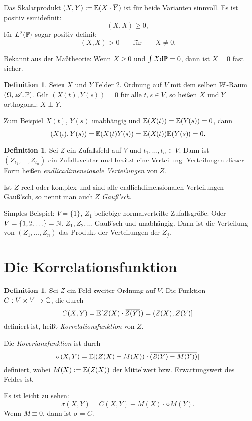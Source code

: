 \documentclass[
 a4paper,
 12pt,
 parskip=half
 ]{scrreprt}
\theoremstyle{plain}
\theoremstyle{definition}
\newtheorem{defn}[thm]{Definition}
\numberwithin{equation}{section}
\begin{document}
Das Skalarprodukt $(X,Y) := \pE( X \cdot \obar{Y})$ ist für beide Varianten
sinnvoll. Es ist positiv semidefinit:
\[ (X,X) \ge 0, \]
für $L^2(\mathbb{P})$ sogar
positiv definit:
\[ (X,X) > 0 \qquad \text{für} \qquad X \ne 0. \]

Bekannt aus der Maßtheorie: Wenn $X \ge 0$ und $\int X \mathrm{d} \mathbb{P} = 0$, dann
ist $X = 0$ fast sicher.

\begin{defn}
  Seien $X$ und $Y$ Felder 2. Ordnung auf $V$ mit dem selben $\mathbb{W}$-Raum
  $(\Omega, \mathscr{A}, \mathbb{P})$. Gilt $(X(t),Y(s)) = 0$ für alle $t,s \in V$, so heißen
  $X$ und $Y$ orthogonal: $X \perp Y$.

  Zum Beispiel $X(t)$, $Y(s)$ unabhängig und $\mathbb{E}(X(t)) = \mathbb{E}(Y(s)) = 0$, dann
  \[ (X(t),Y(s)) = \pE(X(t) \obar{Y(s)}) = \pE(X(t)) \pE(\obar{Y(s)}) = 0. \]
\end{defn}

\begin{defn}
  Sei $Z$ ein Zufallsfeld auf $V$ und $t_1, \ldots, t_n \in V$. Dann ist $(Z_{t_1},
  \ldots, Z_{t_n})$ ein Zufallsvektor und besitzt eine Verteilung. Verteilungen
  dieser Form heißen \emph{endlichdimensionale Verteilungen} von $Z$.

  Ist $Z$ reell oder komplex und sind alle endlichdimensionalen Verteilungen
  Gauß'sch, so nennt man auch $Z$ \emph{Gauß'sch}.

  Simples Beispiel: $V = \{1\}$, $Z_1$ beliebige normalverteilte Zufallsgröße.
  Oder $V = \{1, 2, \ldots\} = \mathbb{N}$, $Z_1, Z_2, \ldots$ Gauß'sch und
  unabhängig. Dann ist die Verteilung von $(Z_1, \ldots, Z_n)$ das Produkt der
  Verteilungen der $Z_j$.
\end{defn}

\section{Die Korrelationsfunktion}
\begin{defn}
  Sei $Z$ ein Feld zweiter Ordnung auf $V$. Die Funktion $C: V \times V \to
  \mathbb{C}$, die durch
  \[ C(X,Y) = \pE[ Z(X) \cdot \obar{Z(Y)} ) = ( Z(X), Z(Y) ] \]
  definiert ist, heißt \emph{Korrelationsfunktion} von $Z$.

  Die \emph{Kovarianzfunktion} ist durch
  \[ \sigma(X,Y) = \pE [ (Z(X) - M(X)) \cdot \obar{(Z(Y) - M(Y))}] \]
  definiert, wobei $M(X) := \mathbb{E}(Z(X))$ der Mittelwert bzw. Erwartungswert des
  Feldes ist.
\end{defn}

Es ist leicht zu sehen:
\[ \sigma( X, Y ) = C(X,Y) - M(X) \cdot \obar{M(Y)}. \]
Wenn $M \equiv 0$, dann ist $\sigma = C$.
\end{document}
